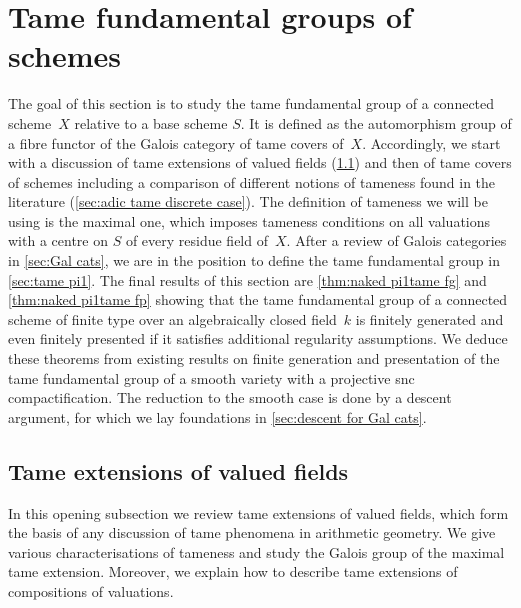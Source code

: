 \section{Tame fundamental groups of schemes}
\label{sec:pit schemes}

The goal of this section is to study the tame fundamental group of a connected scheme~$X$ relative to a base scheme $S$.
It is defined as the automorphism group of a fibre functor of the Galois category of tame covers of~$X$.
Accordingly, we start with a discussion of tame extensions of valued fields (\cref{sec:tame extensions valued fields}) and then of tame covers of schemes including a comparison of different notions of tameness found in the literature (\cref{sec:adic tame discrete case}).
The definition of tameness we will be using is the maximal one, which imposes tameness conditions on all valuations with a centre on $S$ of every residue field of~$X$. 
After a review of Galois categories in \cref{sec:Gal cats}, we are in the position to define the tame fundamental group in \cref{sec:tame pi1}.
The final results of this section are \cref{thm:naked pi1tame fg} and \cref{thm:naked pi1tame fp} showing that the tame fundamental group of a connected scheme of finite type over an algebraically closed field~$k$ is finitely generated and even finitely presented if it satisfies additional regularity assumptions.
We deduce these theorems from existing results \cite{EsnaultShustermanSrinivas2022:FinitePresentationTame} on finite generation and presentation of the tame fundamental group of a smooth variety with a projective snc compactification.
The reduction to the smooth case is done by a descent argument, for which we lay foundations in \cref{sec:descent for Gal cats}.

\subsection{Tame extensions of valued fields} 
\label{sec:tame extensions valued fields}

In this opening subsection we review tame extensions of valued fields, which form the basis of any discussion of tame phenomena in arithmetic geometry.
We give various characterisations of tameness and study the Galois group of the maximal tame extension.
Moreover, we explain how to describe tame extensions of compositions of valuations.

